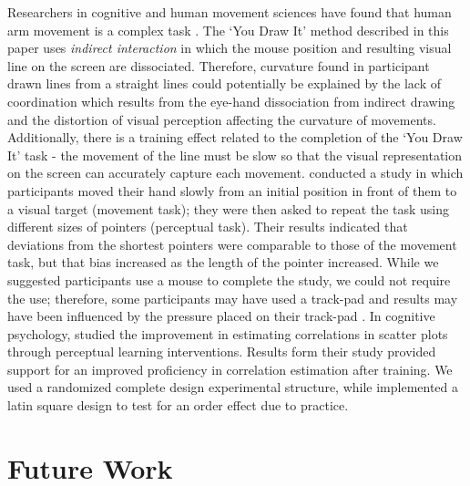 \documentclass[12pt]{article}
\begin{document}
Researchers in cognitive and human movement sciences have found that
human arm movement is a complex task
\citep{miall1995curvature, rousset2015study}. The `You Draw It' method
described in this paper uses \emph{indirect interaction} in which the
mouse position and resulting visual line on the screen are dissociated.
Therefore, curvature found in participant drawn lines from a straight
lines could potentially be explained by the lack of coordination which
results from the eye-hand dissociation from indirect drawing and the
distortion of visual perception affecting the curvature of movements.
Additionally, there is a training effect related to the completion of
the `You Draw It' task - the movement of the line must be slow so that
the visual representation on the screen can accurately capture each
movement. \citet{de1991misdirections} conducted a study in which
participants moved their hand slowly from an initial position in front
of them to a visual target (movement task); they were then asked to
repeat the task using different sizes of pointers (perceptual task).
Their results indicated that deviations from the shortest pointers were
comparable to those of the movement task, but that bias increased as the
length of the pointer increased. While we suggested participants use a
mouse to complete the study, we could not require the use; therefore,
some participants may have used a track-pad and results may have been
influenced by the pressure placed on their track-pad
\citep{easton1978finger}. In cognitive psychology, \citet{cui_2018}
studied the improvement in estimating correlations in scatter plots
through perceptual learning interventions. Results form their study
provided support for an improved proficiency in correlation estimation
after training. We used a randomized complete design experimental
structure, while \citet{mosteller1981eye} implemented a latin square
design to test for an order effect due to practice.

\hypertarget{future-work}{%
\section{Future Work}\label{future-work}}
\end{document}
